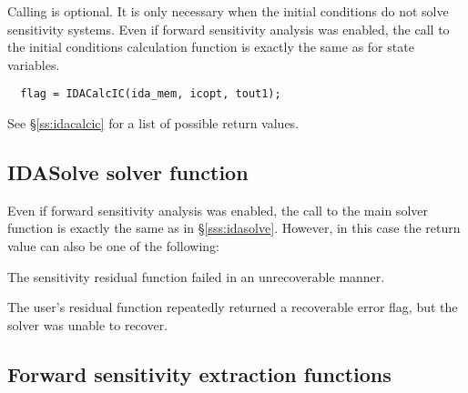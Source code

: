 Calling  is optional. It is only necessary when the  
initial conditions do not solve sensitivity systems. Even if forward 
sensitivity analysis was enabled, the call to the initial conditions
calculation function  is exactly the same as for state 
variables.

\begin{verbatim}
  flag = IDACalcIC(ida_mem, icopt, tout1);
\end{verbatim}

See \S\ref{ss:idacalcic} for a list of possible return values.


\subsection{IDASolve solver function}
Even if forward sensitivity analysis was enabled, the call to the main solver 
function  is exactly the same as in \S\ref{sss:idasolve}. However, 
in this case the return value  can also be one of the following:
\begin{args}
\item[\Id{IDA\_SRES\_FAIL}]
  The sensitivity residual function failed in an unrecoverable manner.
\item[\Id{IDA\_REP\_SRES\_ERR}]
  The user's residual function repeatedly returned a recoverable error flag, 
  but the solver was unable to recover.
\end{args}


\subsection{Forward sensitivity extraction functions}\label{ss:sensi_get}

